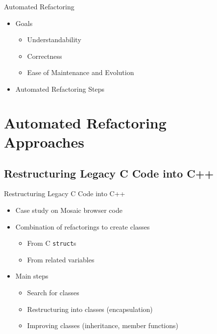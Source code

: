 \documentclass{beamer}
\begin{document}
\begin{frame}{Automated Refactoring}
  \begin{itemize}
    \item Goals
    \begin{itemize}
      \item Understandability
      \item Correctness
      \item Ease of Maintenance and Evolution
    \end{itemize}
  \end{itemize}
  \pause
  \begin{itemize}
    \item Automated Refactoring Steps
    
  \end{itemize}
\end{frame}

\section{Automated Refactoring Approaches}

\subsection{Restructuring Legacy C Code into C++}

\begin{frame}{Restructuring Legacy C Code into C++}
  
  \begin{itemize}
    \item Case study on Mosaic browser code
    \pause
    \item Combination of refactorings to create classes
    \begin{itemize}
      \item From C \texttt{struct}s
      \item From related variables
    \end{itemize}
    \pause
    \item Main steps
    \begin{itemize}
      \item Search for classes
      \item \alert<4>{Restructuring into classes (encapsulation)}
      \item Improving classes (inheritance, member functions)
    \end{itemize}
  \end{itemize}
\end{frame}
\end{document}
